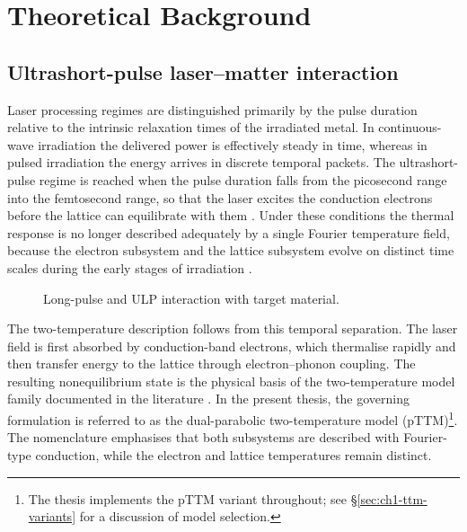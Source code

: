 \chapter{Theoretical Background}
\label{ch:theoretical-background}

\section{Ultrashort-pulse laser--matter interaction}
\label{sec:ch1-ultrashort}

Laser processing regimes are distinguished primarily by the pulse duration relative to the intrinsic relaxation times of the irradiated metal. In continuous-wave irradiation the delivered power is effectively steady in time, whereas in pulsed irradiation the energy arrives in discrete temporal packets. The ultrashort-pulse regime is reached when the pulse duration falls from the picosecond range into the femtosecond range, so that the laser excites the conduction electrons before the lattice can equilibrate with them \cite{Alexopoulou_2023,Zhang_2015}. Under these conditions the thermal response is no longer described adequately by a single Fourier temperature field, because the electron subsystem and the lattice subsystem evolve on distinct time scales during the early stages of irradiation \cite{Alexopoulou_2023,Zhang_2015}.

\begin{figure}[htbp]
  \centering
  \PublicFigureOmitted[0.85\linewidth]
  \caption{Long-pulse and ULP interaction with target material.\cite{Hamad_2016}}
  \label{fig:ch1-long-short-pulse}
\end{figure}

The two-temperature description follows from this temporal separation. The laser field is first absorbed by conduction-band electrons, which thermalise rapidly and then transfer energy to the lattice through electron--phonon coupling.
The resulting nonequilibrium state is the physical basis of the two-temperature model family documented in the literature \cite{Forsman_1998, ByskovNielsen_2011, Zhao_2014, Zhang_2015,Petrov_2021, Bulgakova_2021, Alexopoulou_2023, Takabe_2024, Shim_2026}.
In the present thesis, the governing formulation is referred to as the dual-parabolic two-temperature model (pTTM)\footnote{The thesis implements the pTTM variant throughout; see \S\ref{sec:ch1-ttm-variants} for a discussion of model selection.}. The nomenclature emphasises that both subsystems are described with Fourier-type conduction, while the electron and lattice temperatures remain distinct.

